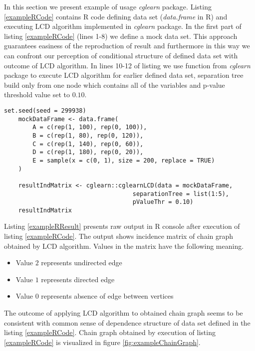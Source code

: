 %
%


In this section we present example of usage \textit{cglearn} package.
Listing \ref{exampleRCode} contains R code defining data set (\textit{data.frame} in R) and executing
LCD algorithm implemented in \textit{cglearn} package. In the first part of listing \ref{exampleRCode} (lines 1-8)
we define a mock data set. This approach guarantees easiness of the reproduction of result and furthermore 
in this way we can confront our perception of conditional structure of defined data set with outcome of LCD algorithm.
In lines 10-12 of listing we use function from \textit{cglearn} package to execute LCD algorithm for earlier defined
data set, separation tree build only from one node which contains all of the variables and p-value threshold value set to $0.10$.


\begin{lstlisting}[caption={Example usage of \textit{cglearn} package.}, label={exampleRCode}]
	set.seed(seed = 299938)		
	mockDataFrame <- data.frame(
		A = c(rep(1, 100), rep(0, 100)),
		B = c(rep(1, 80), rep(0, 120)),
		C = c(rep(1, 140), rep(0, 60)),
		D = c(rep(1, 180), rep(0, 20)),
		E = sample(x = c(0, 1), size = 200, replace = TRUE)
	)

	resultIndMatrix <- cglearn::cglearnLCD(data = mockDataFrame,
					       			separationTree = list(1:5),
					       			pValueThr = 0.10)
	resultIndMatrix
\end{lstlisting}

Listing \ref{exampleRResult} presents raw output in R console after execution of listing \ref{exampleRCode}.
The output shows incidence matrix of chain graph obtained by LCD algorithm. Values in the matrix have the following meaning.

\begin{itemize}
	\item Value $2$ represents undirected edge
	\item Value $1$ represents directed edge
	\item Value $0$ represents absence of edge between vertices
\end{itemize}


The outcome of applying LCD algorithm to obtained chain graph seems to be consistent with common sense of dependence structure of 
data set defined in the listing \ref{exampleRCode}.
Chain graph obtained by execution of listing \ref{exampleRCode} is visualized in figure \ref{fig:exampleChainGraph}.

